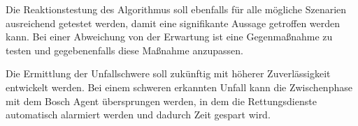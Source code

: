 Die Reaktionstestung des Algorithmus soll ebenfalls für alle mögliche Szenarien ausreichend getestet werden, damit eine signifikante Aussage getroffen werden kann. Bei einer Abweichung von der Erwartung ist eine Gegenmaßnahme zu testen und gegebenenfalls diese Maßnahme anzupassen.

Die Ermittlung der Unfallschwere soll zukünftig mit höherer Zuverlässigkeit entwickelt werden. Bei einem schweren erkannten Unfall kann die Zwischenphase mit dem Bosch Agent übersprungen werden, in dem die Rettungsdienste automatisch alarmiert werden und dadurch Zeit gespart wird.

%
%
%
